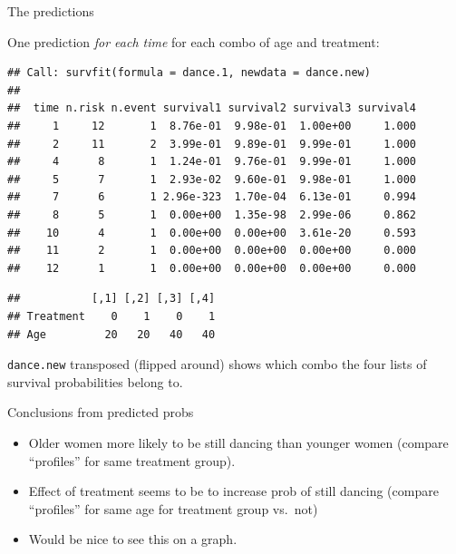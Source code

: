 \begin{frame}[fragile]{The predictions}

One prediction \emph{for each time} for each combo of age and treatment:

{\footnotesize
 
\begin{knitrout}
\color{fgcolor}\begin{kframe}
\begin{alltt}
\end{alltt}
\begin{verbatim}
## Call: survfit(formula = dance.1, newdata = dance.new)
## 
##  time n.risk n.event survival1 survival2 survival3 survival4
##     1     12       1  8.76e-01  9.98e-01  1.00e+00     1.000
##     2     11       2  3.99e-01  9.89e-01  9.99e-01     1.000
##     4      8       1  1.24e-01  9.76e-01  9.99e-01     1.000
##     5      7       1  2.93e-02  9.60e-01  9.98e-01     1.000
##     7      6       1 2.96e-323  1.70e-04  6.13e-01     0.994
##     8      5       1  0.00e+00  1.35e-98  2.99e-06     0.862
##    10      4       1  0.00e+00  0.00e+00  3.61e-20     0.593
##    11      2       1  0.00e+00  0.00e+00  0.00e+00     0.000
##    12      1       1  0.00e+00  0.00e+00  0.00e+00     0.000
\end{verbatim}
\begin{alltt}
\end{alltt}
\begin{verbatim}
##           [,1] [,2] [,3] [,4]
## Treatment    0    1    0    1
## Age         20   20   40   40
\end{verbatim}
\end{kframe}
\end{knitrout}
}

\texttt{dance.new} transposed (flipped around) shows which combo the
four lists of survival probabilities belong to.
  
\end{frame}

\begin{frame}[fragile]{Conclusions from predicted probs}

  \begin{itemize}
  \item Older women more likely to be still dancing than younger women
    (compare ``profiles'' for same treatment group).
  \item Effect of treatment seems to be to increase prob of still dancing (compare ``profiles'' for same age for treatment group vs.\ not)
  \item Would be nice to see this on a graph.
  \end{itemize}
  
\end{frame}

